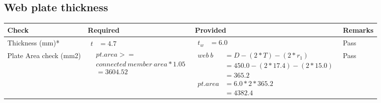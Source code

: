 \documentclass{article}%
\begin{document}
%
\newpage%
\subsection{Web plate thickness}%
\label{subsec:Webplatethickness}%
\renewcommand{\arraystretch}{1.2}%
\begin{longtable}{|p{2.5cm}|p{4.5cm}|p{7cm}|p{1.5cm}|}%
\hline%
\rowcolor{OsdagGreen}%
Check&Required&Provided&Remarks\\%
\hline%
\endhead%
\hline%
Thickness (mm)*&$\begin{aligned} t &=4.7\end{aligned}$&$\begin{aligned} t_w &=6.0\end{aligned}$&Pass\\%
\hline%
Plate Area check (mm2)&$\begin{aligned} &pt.area >= \\&connected~member~area * 1.05\\  &= 3604.52\end{aligned}$&$\begin{aligned} web~b &= D-(2*T)-(2*r_1)\\ &=450.0-(2*17.4)-(2*15.0)\\ &= 365.2 \\  pt.area &= 6.0*2* 365.2\\ &= 4382.4\end{aligned}$&Pass\\%
\hline%
\end{longtable}

%
\newpage%
\end{document}
